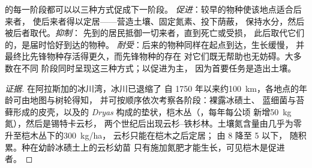 \begin{proposition}[替代的机制]\label{prop:b1:ecosystem-dynamics:mechanisms}
的每一阶段都可以以三种方式促成下一阶段。
\emph{促进}：较早的物种使该地点适合后来者，
使后来者得以定居——营造土壤、固定氮素、投下荫蔽，
保持水分，然后被后者取代。\emph{抑制}：
先到的居民抵御一切来者，直到死亡或受损，
此后取代它们的，是届时恰好到达的物种。
\emph{耐受}：后来的物种同样在起点到达，生长缓慢，
并最终比先锋物种存活得更久，而先锋物种的存在
对它们既无帮助也无妨碍。大多数在不同
阶段同时呈现这三种方式；以促进为主，
因为首要任务是造出土壤。
\end{proposition}
\begin{proof}[证据]
在阿拉斯加的冰川湾，冰川已退缩了
自 1750 年以来约\qty{100}{km}，各地点的年龄可由地图与树轮得知，
并可按顺序依次考察各阶段：裸露冰碛土、
蓝细菌与苔藓形成的皮壳，以及的
\emph{Dryas} 构成的垫状，桤木丛（，每年每公顷
新增\qty{50}{kg}氮），然后是锡特卡云杉，
两个世纪后出现云杉–铁杉林。土壤氮含量由几乎为零
升至桤木丛下的\qty{300}{kg/ha}，
云杉只能在桤木之后定居； 由 8 降至 5 以下，
随积累。种在幼龄冰碛土上的云杉幼苗
只有施加氮肥才能生长，可见桤木是促进者。
\end{proof}

